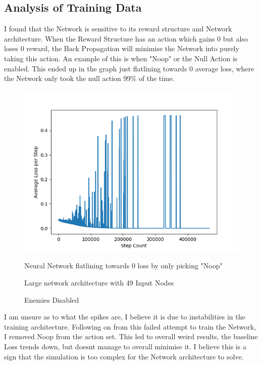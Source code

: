 \begin{flushleft}
    \subsection{Analysis of Training Data}
        I found that the Network is sensitive to its reward structure and Network architecture. When the Reward Structure has an action which
        gains 0 but also loses 0 reward, the Back Propagation will minimise the Network into purely taking this action. An example of this
        is when "Noop" or the Null Action is enabled. This ended up in the graph just flatlining towards 0 average loss, where the Network
        only took the null action 99\% of the time. 

        \begin{figure}[H]
            \centering
            \includegraphics[width=12cm]{Images/Evaluation/NullActionFlatline.png}
            \caption*{Neural Network flatlining towards 0 loss by only picking "Noop"}
            \caption*{Large network architecture with 49 Input Nodes} 
            \caption*{Enemies Disabled}
        \end{figure}

        I am unsure as to what the spikes are, I believe it is due to instabilities in the training architecture. Following on from this failed attempt
        to train the Network, I removed Noop from the action set. This led to overall weird results, the baseline Loss trends down, but doesnt manage to
        overall minimise it. I believe this is a sign that the simulation is too complex for the Network architecture to solve. 


\end{flushleft}
